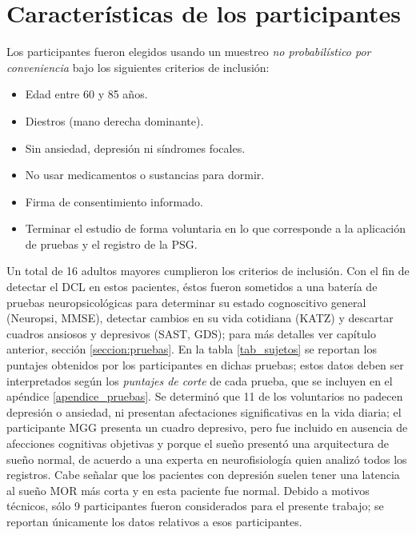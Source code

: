 \documentclass[12pt,letterpaper]{book}
\begin{document}

\section{Características de los participantes}

Los participantes fueron elegidos usando un muestreo \textit{no probabilístico por conveniencia} bajo los siguientes criterios de inclusión:
\begin{itemize}
\item Edad entre 60 y 85 años.
\item Diestros (mano derecha dominante).
\item Sin ansiedad, depresión ni síndromes focales.
\item No usar medicamentos o sustancias para dormir.
\item Firma de consentimiento informado.
\item Terminar el estudio de forma voluntaria en lo que corresponde a la aplicación de pruebas y el registro de la PSG.
\end{itemize}

Un total de 16 adultos mayores cumplieron los criterios de inclusión. 
%
Con el fin de detectar el DCL en estos pacientes, éstos fueron sometidos a una batería de pruebas neuropsicológicas para determinar su estado cognoscitivo general (Neuropsi, MMSE), detectar cambios en su vida cotidiana (KATZ) y descartar cuadros ansiosos y depresivos (SAST, GDS); para más detalles ver capítulo anterior, sección \ref{seccion:pruebas}.
%
En la tabla \ref{tab_sujetos} se reportan los puntajes obtenidos por los participantes en dichas pruebas; estos datos deben ser interpretados según los \textit{puntajes de corte} de cada prueba, que se incluyen en el apéndice \ref{apendice_pruebas}.
%
Se determinó que 11 de los voluntarios no padecen depresión o ansiedad, ni presentan afectaciones significativas en la vida diaria; el participante MGG presenta un cuadro depresivo, pero fue incluido en ausencia de afecciones cognitivas objetivas y porque el sueño presentó una arquitectura de sueño normal, de acuerdo a una experta en neurofisiología quien analizó todos los registros. Cabe señalar que los pacientes con depresión suelen tener una latencia al sueño MOR más corta y en esta paciente fue normal.
%
Debido a motivos técnicos, sólo 9 participantes fueron considerados para el presente trabajo; se reportan únicamente los datos relativos a esos participantes.
\end{document}
